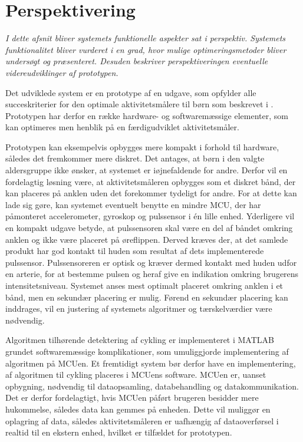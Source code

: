 \section{Perspektivering}\label{sec:perspektivering}
\textit{I dette afsnit bliver systemets funktionelle aspekter sat i perspektiv. Systemets funktionalitet bliver vurderet i en grad, hvor mulige optimeringsmetoder bliver undersøgt og præsenteret. Desuden beskriver perspektiveringen eventuelle videreudviklinger af prototypen.}

Det udviklede system er en prototype af en udgave, som opfylder alle succeskriterier for den optimale aktivitetsmålere til børn som beskrevet i . Prototypen har derfor en række hardware- og softwaremæssige elementer, som kan optimeres men henblik på en færdigudviklet aktivitetsmåler.

Prototypen kan eksempelvis opbygges mere kompakt i forhold til hardware, således det fremkommer mere diskret. Det antages, at børn i den valgte aldersgruppe ikke ønsker, at systemet er iøjnefaldende for andre. Derfor vil en fordelagtig løsning være, at aktivitetsmåleren opbygges som et diskret bånd, der kan placeres på anklen uden det forekommer tydeligt for andre. For at dette kan lade sig gøre, kan systemet eventuelt benytte en mindre MCU, der har påmonteret accelerometer, gyroskop og pulssensor i én lille enhed. Yderligere vil en kompakt udgave betyde, at pulssensoren skal være en del af båndet omkring anklen og ikke være placeret på øreflippen. Derved kræves der, at det samlede produkt har god kontakt til huden som resultat af dets implementerede pulssensor. Pulssensoreren er optisk og kræver dermed kontakt med huden udfor en arterie, for at bestemme pulsen og heraf give en indikation omkring brugerens intensitetsniveau. Systemet anses mest optimalt placeret omkring anklen i et bånd, men en sekundær placering er mulig. Førend en sekundær placering kan inddrages, vil en justering af systemets algoritmer og tærskelværdier være nødvendig. 

Algoritmen tilhørende detektering af cykling er implementeret i MATLAB grundet softwaremæssige komplikationer, som umuliggjorde implementering af algoritmen på MCUen. Et fremtidigt system bør derfor have en implementering, af algoritmen til cykling placeres i MCUens software. MCUen er, uanset opbygning, nødvendig til dataopsamling, databehandling og datakommunikation. Det er derfor fordelagtigt, hvis MCUen påført brugeren besidder mere hukommelse, således data kan gemmes på enheden. Dette vil muliggør en oplagring af data, således aktivitetsmåleren er uafhængig af dataoverførsel i realtid til en ekstern enhed, hvilket er tilfældet for prototypen. 

